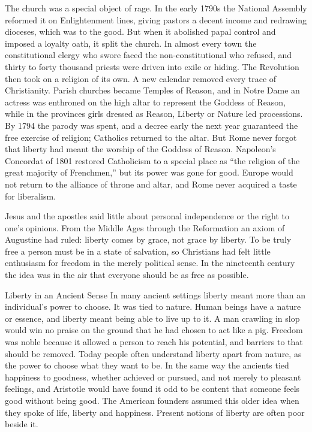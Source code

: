 The church was a special object of rage. In the early 1790s the National Assembly reformed it on
Enlightenment lines, giving pastors a decent income and redrawing dioceses, which was to the good.
But when it abolished papal control and imposed a loyalty oath, it split the church. In almost every
town the constitutional clergy who swore faced the non-constitutional who refused, and thirty to
forty thousand priests were driven into exile or hiding. The Revolution then took on a religion of
its own. A new calendar removed every trace of Christianity. Parish churches became Temples of
Reason, and in Notre Dame an actress was enthroned on the high altar to represent the Goddess of Reason, while
in the provinces girls dressed as Reason, Liberty or Nature led processions. By 1794 the parody was
spent, and a decree early the next year guaranteed the free exercise of religion; Catholics returned
to the altar. But Rome never forgot that liberty had meant the worship of the Goddess of Reason.
Napoleon's Concordat of 1801 restored Catholicism to a special place as ``the religion of the great
majority of Frenchmen,'' but its power was gone for good. Europe would not return to the alliance of
throne and altar, and Rome never acquired a taste for liberalism.

Jesus and the apostles said little about personal independence or the right to one's opinions.
From the Middle Ages through the Reformation an axiom of Augustine had ruled: liberty comes by grace, not
grace by liberty. To be truly free a person must be in a state of salvation, so Christians had felt
little enthusiasm for freedom in the merely political sense. In the nineteenth century the idea was
in the air that everyone should be as free as possible.

\begin{sidebox}{Liberty in an Ancient Sense}
In many ancient settings liberty meant more than an individual's power to choose. It was tied to
nature. Human beings have a nature or essence, and liberty meant being able to live up to it. A man
crawling in slop would win no praise on the ground that he had chosen to act like a pig. Freedom was
noble because it allowed a person to reach his potential, and barriers to that should be removed.
Today people often understand liberty apart from nature, as the power to choose what they want to be.
In the same way the ancients tied happiness to goodness, whether achieved or pursued, and not merely to pleasant feelings, and
Aristotle would have found it odd to be content that someone feels good without being good. The
American founders assumed this older idea when they spoke of life, liberty and happiness. Present
notions of liberty are often poor beside it.
\end{sidebox}

